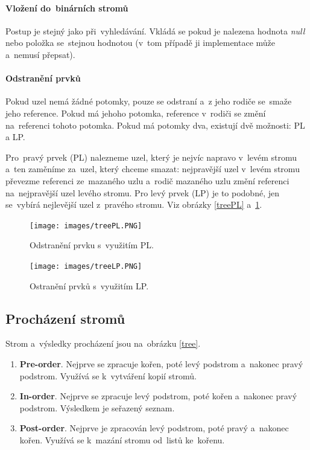 \paragraph{Vložení do~binárních stromů} Postup je stejný jako při~vyhledávání. Vkládá se pokud je nalezena hodnota \emph{null} nebo položka se~stejnou hodnotou (v~tom případě ji implementace může a~nemusí přepsat).

\paragraph{Odstranění prvků} Pokud uzel nemá žádné potomky, pouze se odstraní a~z jeho rodiče se~smaže jeho reference. Pokud má jehoho potomka, reference v~rodiči se změní na~referenci tohoto potomka. Pokud má potomky dva, existují dvě možnosti: PL a LP.

Pro~pravý prvek (PL) nalezneme uzel, který je nejvíc napravo v~levém stromu a~ten zaměníme za~uzel, který chceme smazat: nejpravější uzel v~levém stromu převezme referenci ze~mazaného uzlu a~rodič mazaného uzlu změní referenci na~nejpravější uzel levého stromu. Pro levý prvek (LP) je to podobné, jen se~vybírá nejlevější uzel z~pravého stromu. Viz obrázky \ref{treePL} a~\ref{treeLP}.

\begin{figure}[ht]
	\centering
	\texttt{[image: images/treePL.PNG]}
	\caption{Odstranění prvku s~využitím PL.}
	\label{treePL}

	\texttt{[image: images/treeLP.PNG]}
	\caption{Ostranění prvků s~využitím LP.}
	\label{treeLP}
\end{figure}

\subsection{Procházení stromů}

Strom a~výsledky procházení jsou na~obrázku \ref{tree}.

\begin{enumerate}[noitemsep]
\item \textbf{Pre-order}. Nejprve se zpracuje kořen, poté levý podstrom a~nakonec pravý podstrom. Využívá se k~vytváření kopií stromů.
\item \textbf{In-order}. Nejprve se zpracuje levý podstrom, poté kořen a~nakonec pravý podstrom. Výsledkem je seřazený seznam.
\item \textbf{Post-order}. Nejprve je zpracován levý podstrom, poté pravý a~nakonec kořen. Využívá se k~mazání stromu od~listů ke~kořenu.
\end{enumerate}

